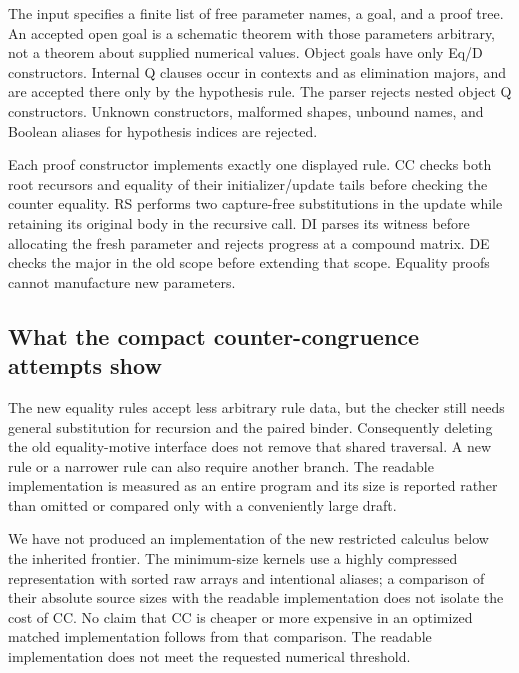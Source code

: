 \documentclass[11pt,letterpaper]{article}
\theoremstyle{definition}\newtheorem{definition}[theorem]{Definition}
\theoremstyle{remark}\newtheorem{remark}[theorem]{Remark}
\begin{document}
The input specifies a finite list of free parameter names, a goal, and
a proof tree. An accepted open goal is a schematic theorem with those
parameters arbitrary, not a theorem about supplied numerical values.
Object goals have only Eq/D constructors. Internal Q clauses occur in
contexts and as elimination majors, and are accepted there only by the
hypothesis rule. The parser rejects nested object Q constructors.
Unknown constructors, malformed shapes, unbound names, and Boolean
aliases for hypothesis indices are rejected.

Each proof constructor implements exactly one displayed rule. CC checks
both root recursors and equality of their initializer/update tails
before checking the counter equality. RS performs two capture-free
substitutions in the update while retaining its original body in the
recursive call. DI parses its witness before allocating the fresh
parameter and rejects progress at a compound matrix. DE checks the
major in the old scope before extending that scope. Equality proofs
cannot manufacture new parameters.



\subsection{What the compact counter-congruence attempts show}

The new equality rules accept less arbitrary rule data, but the checker
still needs general substitution for recursion and the paired binder.
Consequently deleting the old equality-motive interface does not remove
that shared traversal. A new rule or a narrower rule can also require
another branch. The readable implementation is measured as an entire
program and its size is reported rather than omitted or compared only
with a conveniently large draft.

We have not produced an implementation of the new restricted calculus
below the inherited frontier. The minimum-size kernels use a highly compressed
representation with sorted raw arrays and intentional aliases; a
comparison of their absolute source sizes with the readable implementation
does not isolate the cost of CC. No claim that CC is cheaper or more
expensive in an optimized matched implementation follows from that
comparison. The readable implementation does not meet the requested
numerical threshold.
\end{document}
